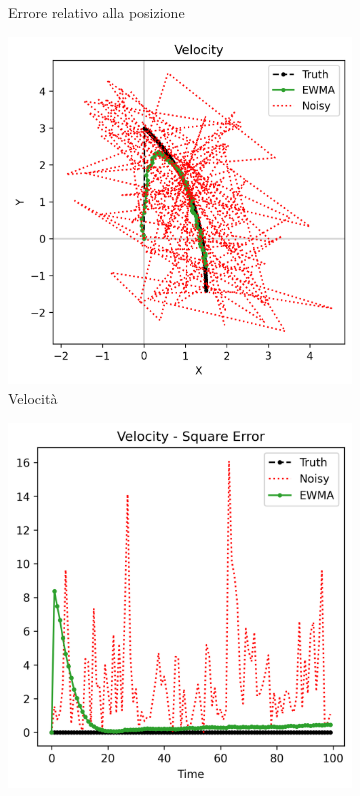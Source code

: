 \begin{figure}
\begin{subfigure}[b]{0.45\textwidth}
        \caption{Errore relativo alla posizione}
    \end{subfigure}
    \vfill
    \begin{subfigure}[b]{0.45\textwidth}
        \includegraphics[width=\textwidth]{images/vel0.png}
        \caption{Velocità}
    \end{subfigure}
    \hfill
    \begin{subfigure}[b]{0.45\textwidth}
        \includegraphics[width=\textwidth]{images/vel0err.png}

\end{subfigure}
\end{figure}
